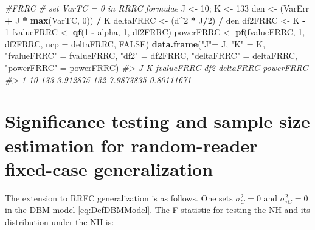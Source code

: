 \documentclass[
]{book}
\newenvironment{Shaded}{\begin{snugshade}}{\end{snugshade}}
\newcommand{\CommentTok}[1]{\textcolor[rgb]{0.56,0.35,0.01}{\textit{#1}}}
\newcommand{\DataTypeTok}[1]{\textcolor[rgb]{0.13,0.29,0.53}{#1}}
\newcommand{\DecValTok}[1]{\textcolor[rgb]{0.00,0.00,0.81}{#1}}
\newcommand{\KeywordTok}[1]{\textcolor[rgb]{0.13,0.29,0.53}{\textbf{#1}}}
\newcommand{\NormalTok}[1]{#1}
\newcommand{\OperatorTok}[1]{\textcolor[rgb]{0.81,0.36,0.00}{\textbf{#1}}}
\newcommand{\OtherTok}[1]{\textcolor[rgb]{0.56,0.35,0.01}{#1}}
\newcommand{\StringTok}[1]{\textcolor[rgb]{0.31,0.60,0.02}{#1}}
\begin{document}
\begin{Shaded}
\begin{Highlighting}[]
\CommentTok{\#FRRC}
\CommentTok{\# set VarTC = 0 in RRRC formulae}
\NormalTok{J \textless{}{-}}\StringTok{ }\DecValTok{10}\NormalTok{; K \textless{}{-}}\StringTok{ }\DecValTok{133}
\NormalTok{den \textless{}{-}}\StringTok{ }\NormalTok{(VarErr }\OperatorTok{+}\StringTok{ }\NormalTok{J }\OperatorTok{*}\StringTok{ }\KeywordTok{max}\NormalTok{(VarTC, }\DecValTok{0}\NormalTok{)) }\OperatorTok{/}\StringTok{ }\NormalTok{K}
\NormalTok{deltaFRRC \textless{}{-}}\StringTok{ }\NormalTok{(d}\OperatorTok{\^{}}\DecValTok{2} \OperatorTok{*}\StringTok{ }\NormalTok{J}\OperatorTok{/}\DecValTok{2}\NormalTok{) }\OperatorTok{/}\StringTok{ }\NormalTok{den}
\NormalTok{df2FRRC \textless{}{-}}\StringTok{ }\NormalTok{K }\OperatorTok{{-}}\StringTok{ }\DecValTok{1}
\NormalTok{fvalueFRRC \textless{}{-}}\StringTok{ }\KeywordTok{qf}\NormalTok{(}\DecValTok{1} \OperatorTok{{-}}\StringTok{ }\NormalTok{alpha, }\DecValTok{1}\NormalTok{, df2FRRC)}
\NormalTok{powerFRRC \textless{}{-}}\StringTok{ }\KeywordTok{pf}\NormalTok{(fvalueFRRC, }\DecValTok{1}\NormalTok{, df2FRRC, }\DataTypeTok{ncp =}\NormalTok{ deltaFRRC, }\OtherTok{FALSE}\NormalTok{)}
\KeywordTok{data.frame}\NormalTok{(}\StringTok{"J"}\NormalTok{=}\StringTok{ }\NormalTok{J,  }\StringTok{"K"}\NormalTok{ =}\StringTok{ }\NormalTok{K, }\StringTok{"fvalueFRRC"}\NormalTok{ =}\StringTok{ }\NormalTok{fvalueFRRC, }\StringTok{"df2"}\NormalTok{ =}\StringTok{ }\NormalTok{df2FRRC, }\StringTok{"deltaFRRC"}\NormalTok{ =}\StringTok{ }\NormalTok{deltaFRRC, }\StringTok{"powerFRRC"}\NormalTok{ =}\StringTok{ }\NormalTok{powerFRRC)}
\CommentTok{\#\textgreater{}    J   K fvalueFRRC df2 deltaFRRC  powerFRRC}
\CommentTok{\#\textgreater{} 1 10 133   3.912875 132 7.9873835 0.80111671}
\end{Highlighting}
\end{Shaded}

\hypertarget{significance-testing-and-sample-size-estimation-for-random-reader-fixed-case-generalization}{%
\section{Significance testing and sample size estimation for random-reader fixed-case generalization}\label{significance-testing-and-sample-size-estimation-for-random-reader-fixed-case-generalization}}

The extension to RRFC generalization is as follows. One sets \(\sigma_C^2 = 0\) and \(\sigma_{\tau C}^2 = 0\) in the DBM model \eqref{eq:DefDBMModel}. The F-statistic for testing the NH and its distribution under the NH is:
\end{document}
